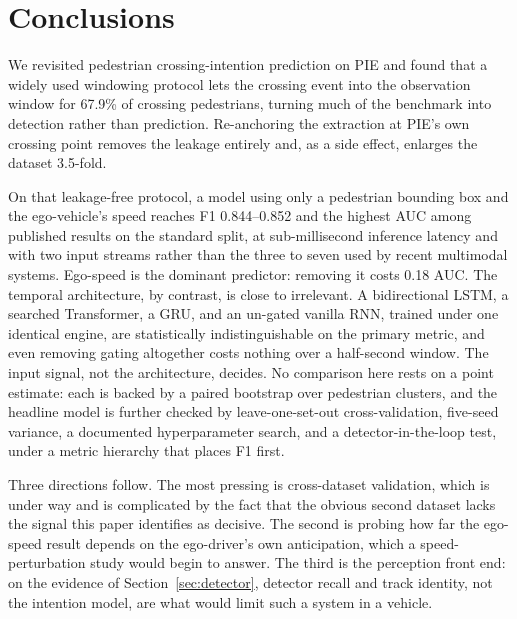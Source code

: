 \documentclass[mti,article,submit,moreauthors]{Definitions/mdpi}
\begin{document}
\section{Conclusions}
\label{sec:conclusions}

We revisited pedestrian crossing-intention prediction on PIE and found that a widely used windowing protocol lets the crossing event into the observation window for 67.9\% of crossing pedestrians, turning much of the benchmark into detection rather than prediction. Re-anchoring the extraction at PIE's own crossing point removes the leakage entirely and, as a side effect, enlarges the dataset 3.5-fold.

On that leakage-free protocol, a model using only a pedestrian bounding box and the ego-vehicle's speed reaches F1 0.844--0.852 and the highest AUC among published results on the standard split, at sub-millisecond inference latency and with two input streams rather than the three to seven used by recent multimodal systems. Ego-speed is the dominant predictor: removing it costs 0.18 AUC. The temporal architecture, by contrast, is close to irrelevant. A bidirectional LSTM, a searched Transformer, a GRU, and an un-gated vanilla RNN, trained under one identical engine, are statistically indistinguishable on the primary metric, and even removing gating altogether costs nothing over a half-second window. The input signal, not the architecture, decides. No comparison here rests on a point estimate: each is backed by a paired bootstrap over pedestrian clusters, and the headline model is further checked by leave-one-set-out cross-validation, five-seed variance, a documented hyperparameter search, and a detector-in-the-loop test, under a metric hierarchy that places F1 first.

Three directions follow. The most pressing is cross-dataset validation, which is under way and is complicated by the fact that the obvious second dataset lacks the signal this paper identifies as decisive. The second is probing how far the ego-speed result depends on the ego-driver's own anticipation, which a speed-perturbation study would begin to answer. The third is the perception front end: on the evidence of Section~\ref{sec:detector}, detector recall and track identity, not the intention model, are what would limit such a system in a vehicle.
\vspace{6pt}

\end{document}
